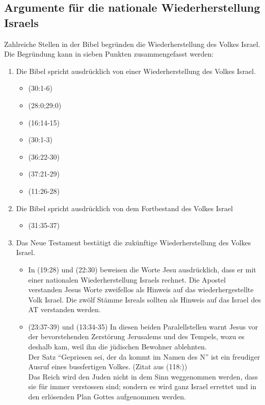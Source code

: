 \documentclass{../../inc/mybib}
\begin{document}
\subsection{Argumente für die nationale Wiederherstellung Israels}
Zahlreiche Stellen in der Bibel begründen die Wiederherstellung des Volkes Israel. Die Begründung kann in sieben Punkten zusammengefasst werden:
\begin{enumerate}
    \item Die Bibel spricht ausdrücklich von einer Wiederherstellung des Volkes Israel.
    \begin{itemize}
        \item {}(30:1-6)
        \item {}(28:0;29:0)
        \item {}(16:14-15)
        \item {}(30:1-3)
        \item {}(36:22-30)
        \item {}(37:21-29)
        \item {}(11:26-28)
    \end{itemize}    
    \item Die Bibel spricht ausdrücklich von dem Fortbestand des Volkes Israel
    \begin{itemize}
        \item {}(31:35-37)
    \end{itemize}
    \item Das Neue Testament bestätigt die zukünftige Wiederherstellung des Volkes Israel.
    \begin{itemize}
        \item In (19:28) und (22:30) beweisen die Worte Jesu ausdrücklich, dass er mit einer nationalen Wiederherstellung Israels rechnet. Die Apostel verstanden Jesus Worte zweifellos als Hinweis auf das wiederhergestellte Volk Israel. Die zwölf Stämme Isreals sollten als Hinweis auf das Israel des AT verstanden werden.
        \item {}(23:37-39) und (13:34-35) In diesen beiden Paralellstellen warnt Jesus vor der bevorstehenden Zerstörung Jerusalems und des Tempels, wozu es deshalb kam, weil ihn die jüdischen Bewohner ablehnten.\\ Der Satz \enquote{Gepriesen sei, der da kommt im Namen des \herr N} ist ein freudiger Ausruf eines bussfertigen Volkes. (Zitat aus (118:)) \\ Das Reich wird den Juden nicht in dem Sinn weggenommen werden, dass sie für immer verstossen sind; sondern es wird \flq ganz Israel\frq{} errettet und in den erlösenden Plan Gottes aufgenommen werden.

\end{itemize}
\end{enumerate}
\end{document}

